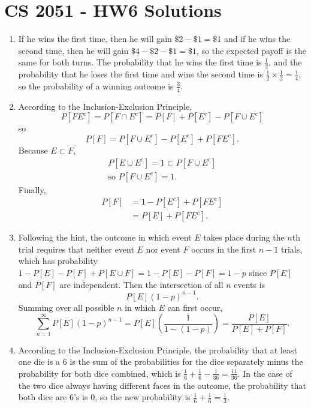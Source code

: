 \documentclass[a4paper,12pt]{article}
\begin{document}
\section*{CS 2051 - HW6 Solutions}

\begin{enumerate}

\item If he wins the first time, then he will gain $\$2 - \$1 = \$1$ and if he wins the second time, then he will gain $\$4 - \$2 - \$1 = \$1$, so the expected payoff is the same for both turns. The probability that he wins the first time is $\frac{1}{2}$, and the probability that he loses the first time and wins the second time is $\frac{1}{2} \times \frac{1}{2} = \frac{1}{4}$, so the probability of a winning outcome is $\frac{3}{4}$.

\item According to the Inclusion-Exclusion Principle,
\[ P[FE^c] = P[F \cap E^c] = P[F] + P[E^c] - P[F \cup E^c] \]
so
\[ P[F] = P[F \cup E^c] - P[E^c] + P[FE^c]. \]
Because $E \subset F$,
\begin{gather*}
P[E \cup E^c] = 1 \subset P[F \cup E^c] \\
\mbox{so } P[F \cup E^c] = 1.
\end{gather*}
Finally,
\begin{align*}
P[F] &= 1 - P[E^c] + P[FE^c] \\
&= P[E] + P[FE^c].
\end{align*}

\item Following the hint, the outcome in which event $E$ takes place during the $n$th trial requires that neither event $E$ nor event $F$ occurs in the first $n - 1$ trials, which has probability $1 - P[E] - P[F] + P[E \cup F] = 1 - P[E] - P[F] = 1 - p$ since $P[E]$ and $P[F]$ are independent. Then the intersection of all $n$ events is
\[ P[E](1 - p)^{n - 1}. \]
Summing over all possible $n$ in which $E$ can first occur,
\[ \sum_{n = 1}^{\infty} P[E](1 - p)^{n - 1} = P[E]\left( \frac{1}{1 - (1 - p)} \right) = \frac{P[E]}{P[E] + P[F]}. \]

\item According to the Inclusion-Exclusion Principle, the probability that at least one die is a 6 is the sum of the probabilities for the dice separately minus the probability for both dice combined, which is $\frac{1}{6} + \frac{1}{6} - \frac{1}{36} = \frac{11}{36}$. In the case of the two dice always having different faces in the outcome, the probability that both dice are $6$'s is $0$, so the new probability is $\frac{1}{6} + \frac{1}{6} = \frac{1}{3}$.


\end{enumerate}
\end{document}
